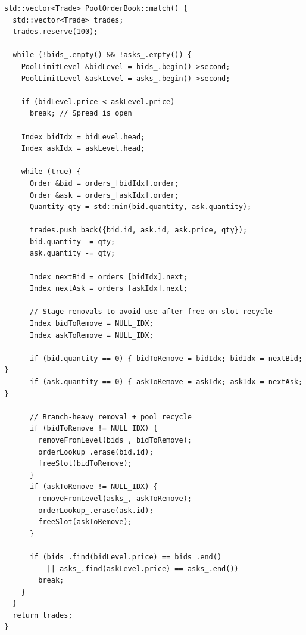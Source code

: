 \documentclass[12pt,a4paper]{report}
\begin{document}
\begin{lstlisting}[caption={Pool Match Branching (src/orderbooks/pool\_order\_book.cpp)}]
std::vector<Trade> PoolOrderBook::match() {
  std::vector<Trade> trades;
  trades.reserve(100);

  while (!bids_.empty() && !asks_.empty()) {
    PoolLimitLevel &bidLevel = bids_.begin()->second;
    PoolLimitLevel &askLevel = asks_.begin()->second;

    if (bidLevel.price < askLevel.price)
      break; // Spread is open

    Index bidIdx = bidLevel.head;
    Index askIdx = askLevel.head;

    while (true) {
      Order &bid = orders_[bidIdx].order;
      Order &ask = orders_[askIdx].order;
      Quantity qty = std::min(bid.quantity, ask.quantity);

      trades.push_back({bid.id, ask.id, ask.price, qty});
      bid.quantity -= qty;
      ask.quantity -= qty;

      Index nextBid = orders_[bidIdx].next;
      Index nextAsk = orders_[askIdx].next;

      // Stage removals to avoid use-after-free on slot recycle
      Index bidToRemove = NULL_IDX;
      Index askToRemove = NULL_IDX;

      if (bid.quantity == 0) { bidToRemove = bidIdx; bidIdx = nextBid; }
      if (ask.quantity == 0) { askToRemove = askIdx; askIdx = nextAsk; }

      // Branch-heavy removal + pool recycle
      if (bidToRemove != NULL_IDX) {
        removeFromLevel(bids_, bidToRemove);
        orderLookup_.erase(bid.id);
        freeSlot(bidToRemove);
      }
      if (askToRemove != NULL_IDX) {
        removeFromLevel(asks_, askToRemove);
        orderLookup_.erase(ask.id);
        freeSlot(askToRemove);
      }

      if (bids_.find(bidLevel.price) == bids_.end()
          || asks_.find(askLevel.price) == asks_.end())
        break;
    }
  }
  return trades;
}
\end{lstlisting}
\end{document}
